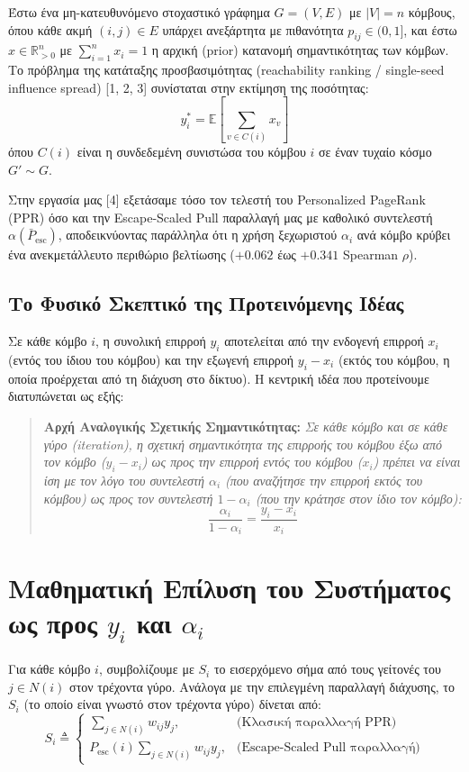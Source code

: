 \documentclass[11pt, a4paper]{article}
\begin{document}
Έστω ένα μη-κατευθυνόμενο στοχαστικό γράφημα $G=(V,E)$ με $|V|=n$ κόμβους, όπου κάθε ακμή $(i,j) \in E$ υπάρχει ανεξάρτητα με πιθανότητα $p_{ij} \in (0,1]$, και έστω $x \in \mathbb{R}^n_{>0}$ με $\sum_{i=1}^n x_i = 1$ η αρχική (prior) κατανομή σημαντικότητας των κόμβων. Το πρόβλημα της κατάταξης προσβασιμότητας (reachability ranking / single-seed influence spread) [1, 2, 3] συνίσταται στην εκτίμηση της ποσότητας:
\[
y^*_i = \mathbb{E}\!\left[\sum_{v \in C(i)} x_v\right]
\]
όπου $C(i)$ είναι η συνδεδεμένη συνιστώσα του κόμβου $i$ σε έναν τυχαίο κόσμο $G' \sim G$.

Στην εργασία μας [4] εξετάσαμε τόσο τον τελεστή του Personalized PageRank (PPR) όσο και την Escape-Scaled Pull παραλλαγή μας με καθολικό συντελεστή $\alpha(\bar{P}_{\mathrm{esc}})$, αποδεικνύοντας παράλληλα ότι η χρήση ξεχωριστού $\alpha_i$ ανά κόμβο κρύβει ένα ανεκμετάλλευτο περιθώριο βελτίωσης ($+0.062$ έως $+0.341$ Spearman $\rho$).

\subsection{Το Φυσικό Σκεπτικό της Προτεινόμενης Ιδέας}

Σε κάθε κόμβο $i$, η συνολική επιρροή $y_i$ αποτελείται από την ενδογενή επιρροή $x_i$ (εντός του ίδιου του κόμβου) και την εξωγενή επιρροή $y_i - x_i$ (εκτός του κόμβου, η οποία προέρχεται από τη διάχυση στο δίκτυο). Η κεντρική ιδέα που προτείνουμε διατυπώνεται ως εξής:

\begin{quote}
\textbf{Αρχή Αναλογικής Σχετικής Σημαντικότητας:} \textit{Σε κάθε κόμβο και σε κάθε γύρο (iteration), η σχετική σημαντικότητα της επιρροής του κόμβου έξω από τον κόμβο ($y_i - x_i$) ως προς την επιρροή εντός του κόμβου ($x_i$) πρέπει να είναι ίση με τον λόγο του συντελεστή $\alpha_i$ (που αναζήτησε την επιρροή εκτός του κόμβου) ως προς τον συντελεστή $1 - \alpha_i$ (που την κράτησε στον ίδιο τον κόμβο):}
\[
\frac{\alpha_i}{1 - \alpha_i} = \frac{y_i - x_i}{x_i}
\]
\end{quote}

\section{Μαθηματική Επίλυση του Συστήματος ως προς $y_i$ και $\alpha_i$}

Για κάθε κόμβο $i$, συμβολίζουμε με $S_i$ το εισερχόμενο σήμα από τους γείτονές του $j \in N(i)$ στον τρέχοντα γύρο. Ανάλογα με την επιλεγμένη παραλλαγή διάχυσης, το $S_i$ (το οποίο είναι γνωστό στον τρέχοντα γύρο) δίνεται από:
\[
S_i \triangleq \begin{cases} \displaystyle\sum_{j \in N(i)} w_{ij} y_j, & \text{(Κλασική παραλλαγή PPR)} \\[12pt] \displaystyle P_{\mathrm{esc}}(i) \sum_{j \in N(i)} w_{ij} y_j, & \text{(Escape-Scaled Pull παραλλαγή)} \end{cases}
\]
\end{document}
